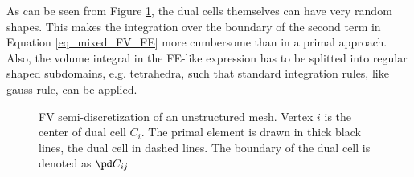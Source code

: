 \documentclass[../main.tex]{subfiles}
\begin{document}
\vskip 1cm 
As can be seen from Figure \ref{fig:dualcell_unstructured}, the dual cells themselves can have very random shapes. This makes the integration over the boundary of the second term in Equation \eqref{eq_mixed_FV_FE} more cumbersome than in a primal approach. Also, the volume integral in the \ac{FE}-like expression has to be splitted into regular shaped subdomains, e.g. tetrahedra, such that standard integration rules, like gauss-rule, can be applied.




\begin{figure}[h]
  \centering
  \scalebox{.65}{}
  \caption[\ac{FV} semi-discretization of an unstructured mesh]{\ac{FV} semi-discretization of an unstructured mesh. Vertex $i$ is the center of dual cell $C_i$. The primal element is drawn in thick black lines, the dual cell in dashed lines. The boundary of the dual cell is denoted as $\pd C_{ij}$}
  \label{fig:dualcell_unstructured}
\end{figure}
\end{document}

